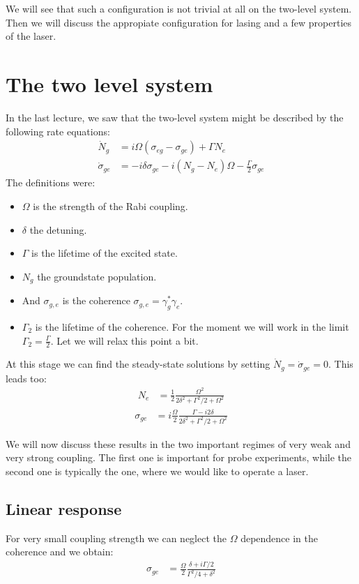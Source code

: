 \documentclass[10pt]{article}
\begin{document}
We will see that such a configuration is not trivial at all on the two-level system. Then we will discuss the appropiate configuration for lasing and a few properties of the laser.

\section{The two level system}
In the last lecture, we saw that the two-level system might be described by the following rate equations:
\begin{align}
\dot{N}_g &= i\Omega(\sigma_{eg}-\sigma_{ge})+\Gamma N_e\\
\dot{\sigma}_{ge}&= -i\delta \sigma_{ge}-i (N_g-N_e)\Omega-\frac{\Gamma}{2}\sigma_{ge}
\end{align}
The definitions were:
\begin{itemize}
\item $\Omega$ is the strength of the Rabi coupling.
\item $\delta$ the detuning.
\item $\Gamma$ is the lifetime of the excited state.
\item $N_g$ the groundstate population.
\item And $\sigma_{g,e}$ is the coherence $\sigma_{g,e} = \gamma_g^* \gamma_e$.
\item $\Gamma_2$ is the lifetime of the coherence. For the moment we will work in the limit $\Gamma_2 = \frac{\Gamma}{2}$. Let we will relax this point a bit.
\end{itemize}
At this stage we can find the steady-state solutions by setting $\dot{N}_g = \dot{\sigma}_{ge} = 0$. This leads too:
\begin{align}\label{Eq:PopTwoLevel}
N_e &= \frac{1}{2}\frac{\Omega^2}{2\delta^2+\Gamma^2/2+\Omega^2}\end{align}
\begin{align}\label{Eq:CohTwoLevel}
\sigma_{ge} &= i\frac{\Omega}{2}\frac{\Gamma-i2\delta}{2\delta^2+\Gamma^2/2+\Omega^2}
\end{align}

We will now discuss these results in the two important regimes of very weak and very strong coupling. The first one is important for probe experiments, while the second one is typically the one, where we would like to operate a laser.

\subsection{Linear response}
For very small coupling strength we can neglect the $\Omega$ dependence in the coherence and we obtain:
\begin{align}
\sigma_{ge} &= \frac{\Omega}{2}\frac{\delta+i\Gamma/2}{\Gamma^2/4+\delta^2}
\end{align}
\end{document}
